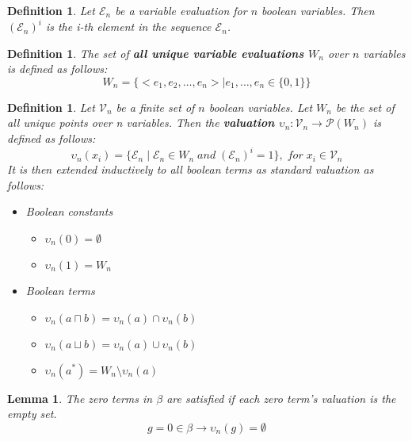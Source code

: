 \documentclass{article}
\newcommand\p{\mathcal{P}}
\newcommand\V{\mathcal{V}}
\newcommand\E{\mathcal{E}}
\newtheorem{lemma}[theorem]{Lemma}
\newtheorem{defn}[theorem]{Definition}
\begin{document}
		\begin{defn}
			Let $\E_n$ be a variable evaluation for $n$ boolean variables. Then $(\E_n)^i$ is the i-th element in the sequence $\E_n$.
		\end{defn}

		\begin{defn}
			The set of \textbf{all unique variable evaluations $W_n$} over $n$ variables is defined as follows:
			\begin{equation}
				\label{all-unique-points}
				W_n = \{< e_1, e_2, \ldots , e_n > \mid e_1, \ldots, e_n \in \{0, 1 \} \}
			\end{equation}
		\end{defn}

		\begin{defn}
			\label{valuation-modal-points}
			Let $\V_n$ be a finite set of $n$ boolean variables. Let $W_n$ be the set of all unique points over n variables. Then the \textbf{valuation $\upsilon_n : \V_n \rightarrow \p(W_n)$} is defined as follows:
		\begin{equation}
			\upsilon_n(x_i) = \{ \E_n \mid \E_n \in W_n \; and \; (\E_n)^i = 1 \}, \; for \; x_i \in \V_n
		\end{equation}
			It is then extended inductively to all boolean terms as standard valuation as follows:
			\begin{itemize}
				\item Boolean constants
					\begin{itemize}
						\item $\upsilon_n(0) = \emptyset$
						\item $\upsilon_n(1) = W_n$
					\end{itemize}
				\item Boolean terms
					\begin{itemize}
						\item $\upsilon_n(a \sqcap b) = \upsilon_n(a) \cap \upsilon_n(b)$
						\item $\upsilon_n(a \sqcup b) = \upsilon_n(a) \cup \upsilon_n(b)$
						\item $\upsilon_n(a^*) = W_n \setminus \upsilon_n(a)$
					\end{itemize}
			\end{itemize}
		\end{defn}

		\begin{lemma}
			The zero terms in $\beta$ are satisfied if each zero term's valuation is the empty set.
			\begin{equation}
				g = 0 \in \beta \rightarrow \upsilon_n(g) = \emptyset
			\end{equation}
		\end{lemma}
\end{document}
